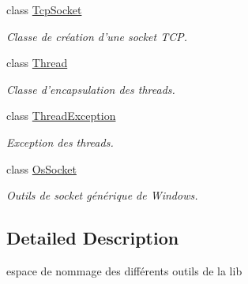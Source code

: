 \begin{DoxyCompactItemize}
class \hyperlink{classmognetwork_1_1_tcp_socket}{Tcp\-Socket}
\begin{DoxyCompactList}\small\item\em Classe de création d'une socket T\-C\-P. \end{DoxyCompactList}\item 
class \hyperlink{classmognetwork_1_1_thread}{Thread}
\begin{DoxyCompactList}\small\item\em Classe d'encapsulation des threads. \end{DoxyCompactList}\item 
class \hyperlink{classmognetwork_1_1_thread_exception}{Thread\-Exception}
\begin{DoxyCompactList}\small\item\em Exception des threads. \end{DoxyCompactList}\item 
class \hyperlink{classmognetwork_1_1_os_socket}{Os\-Socket}
\begin{DoxyCompactList}\small\item\em Outils de socket générique de Windows. \end{DoxyCompactList}\end{DoxyCompactItemize}


\subsection{Detailed Description}
espace de nommage des différents outils de la lib 